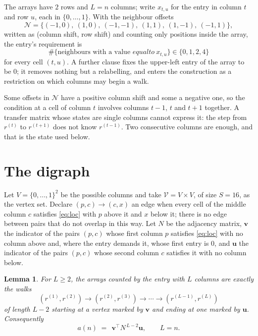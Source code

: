 \documentclass[11pt,a4paper]{article}
\theoremstyle{plain}
\newtheorem{lemma}[theorem]{Lemma}
\theoremstyle{definition}
\begin{document}
The arrays have $2$ rows and $L=n$ columns; write $x_{t,u}$ for the entry in
column $t$ and row $u$, each in $\{0,\dots,1\}$. With the neighbour offsets
\[
\mathcal N=\{(-1,0),\ (1,0),\ (-1,-1),\ (1,1),\ (1,-1),\ (-1,1)\},
\]
written as (column shift, row shift) and counting only positions inside the array, the
entry's requirement is
\begin{equation}\label{eq:loc}
\#\{\text{neighbours with a value }equal to\ x_{t,u}\}\in\{0,1,2,4\}
\end{equation}
for every cell $(t,u)$. A further clause fixes the upper-left entry of the array to be $0$; it removes nothing but a relabelling, and enters the construction as a restriction on which columns may begin a walk.

Some offsets in $\mathcal N$ have a positive column shift and some a negative one, so the
condition at a cell of column $t$ involves columns $t-1$, $t$ and $t+1$ together. A transfer
matrix whose states are single columns cannot express it: the step from $r^{(t)}$ to
$r^{(t+1)}$ does not know $r^{(t-1)}$. Two consecutive columns are enough, and that is
the state used below.

\section{The digraph}

Let $V=\{0,\dots,1\}^{2}$ be the possible columns and take
$\mathcal V=V\times V$, of size $S=16$, as the vertex set. Declare $(p,c)\to(c,x)$ an edge
when every cell of the middle column $c$ satisfies \eqref{eq:loc} with $p$ above it and $x$
below it; there is no edge between pairs that do not overlap in this way. Let $N$ be the
adjacency matrix, $\mathbf{v}$ the indicator of the pairs $(p,c)$ whose first column $p$
satisfies \eqref{eq:loc} with no column above and, where the entry demands it, whose first entry is $0$, and $\mathbf{u}$ the indicator of
the pairs $(p,c)$ whose second column $c$ satisfies it with no column below.

\begin{lemma}\label{lem:walk}
For $L\ge2$, the arrays counted by the entry with $L$ columns are exactly the walks
\[
(r^{(1)},r^{(2)})\to(r^{(2)},r^{(3)})\to\cdots\to(r^{(L-1)},r^{(L)})
\]
of length $L-2$ starting at a vertex marked by $\mathbf{v}$ and ending at one marked by
$\mathbf{u}$. Consequently
\[
a(n)\;=\;\,\mathbf{v}^{\!\top}N^{\,L-2}\mathbf{u},\qquad L=n .
\]
\end{lemma}
\end{document}
